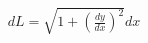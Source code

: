 \documentclass[preview]{standalone}
\begin{document}
\begin{align*}
dL = \sqrt{1 + (\frac{dy}{dx})^{2} } dx
\end{align*}
\end{document}
